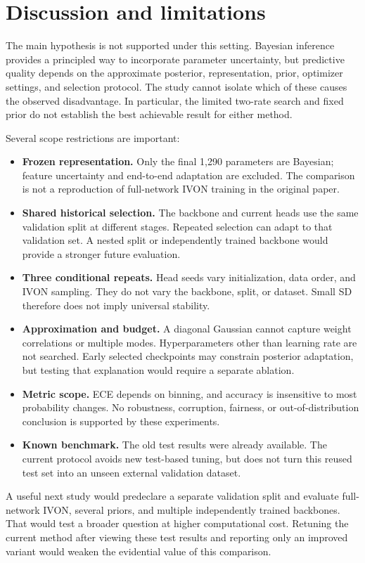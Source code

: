 \documentclass[11pt,a4paper]{article}
\begin{document}
\section{Discussion and limitations}
The main hypothesis is not supported under this setting. Bayesian inference
provides a principled way to incorporate parameter uncertainty, but predictive
quality depends on the approximate posterior, representation, prior, optimizer
settings, and selection protocol. The study cannot isolate which of these causes
the observed disadvantage. In particular, the limited two-rate search and fixed
prior do not establish the best achievable result for either method.

Several scope restrictions are important:
\begin{itemize}[leftmargin=*]
\item \textbf{Frozen representation.} Only the final 1,290 parameters are Bayesian;
feature uncertainty and end-to-end adaptation are excluded. The comparison is
not a reproduction of full-network IVON training in the original paper.
\item \textbf{Shared historical selection.} The backbone and current heads use
the same validation split at different stages. Repeated selection can adapt to
that validation set. A nested split or independently trained backbone would
provide a stronger future evaluation.
\item \textbf{Three conditional repeats.} Head seeds vary initialization, data
order, and IVON sampling. They do not vary the backbone, split, or dataset.
Small SD therefore does not imply universal stability.
\item \textbf{Approximation and budget.} A diagonal Gaussian cannot capture
weight correlations or multiple modes. Hyperparameters other than learning
rate are not searched. Early selected checkpoints may constrain posterior
adaptation, but testing that explanation would require a separate ablation.
\item \textbf{Metric scope.} ECE depends on binning, and accuracy is insensitive
to most probability changes. No robustness, corruption, fairness, or
out-of-distribution conclusion is supported by these experiments.
\item \textbf{Known benchmark.} The old test results were already available.
The current protocol avoids new test-based tuning, but does not turn this reused
test set into an unseen external validation dataset.
\end{itemize}

A useful next study would predeclare a separate validation split and evaluate
full-network IVON, several priors, and multiple independently trained backbones.
That would test a broader question at higher computational cost. Retuning the
current method after viewing these test results and reporting only an improved
variant would weaken the evidential value of this comparison.
\end{document}
